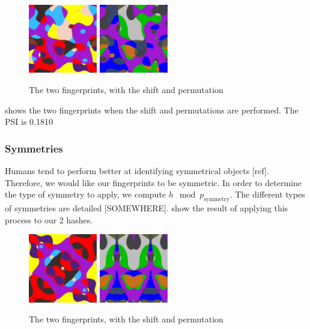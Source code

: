 \documentclass{article}
\begin{document}
\begin{center}
\begin{figure}
    \centering
    \includegraphics[width=3cm]{figures/Shift.png}
    \hspace{3pt}
    \includegraphics[width=3cm]{figures/ShiftP67.png}
    \caption{The two fingerprints, with the shift and permutation}
    \label{fig:shifted}
\end{figure}
\end{center}

 shows the two fingerprints when the shift and permutations are performed. The PSI is 0.1810


\subsubsection{Symmetries}
Humans tend to perform better at identifying symmetrical objects [ref]. Therefore, we would like our fingerprints to be symmetric. In order to determine the type of symmetry to apply, we compute $h \mod p_{\text{symmetry}}$. The different types of symmetries are detailed [SOMEWHERE].  show the result of applying this process to our 2 hashes. 
\begin{center}
\begin{figure}
    \centering
    \includegraphics[width=3cm]{figures/Symmetry.png}
    \hspace{3pt}
    \includegraphics[width=3cm]{figures/SymmetryP67.png}
    \caption{The two fingerprints, with the shift and permutation}
    \label{fig:symms}
\end{figure}
\end{center}
\end{document}
